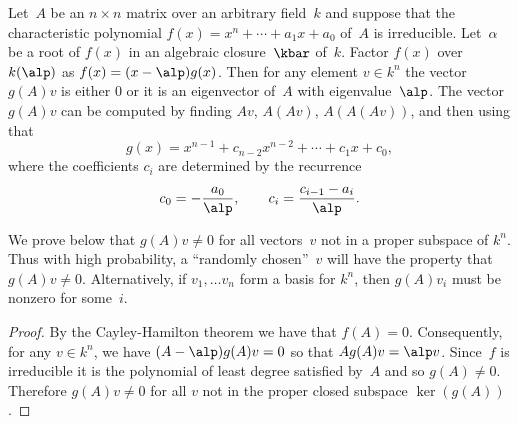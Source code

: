 \documentclass{report}
\begin{document}
\begin{algorithm}\label{alg:eigenvector}
Let~$A$ be an $n\times n$ matrix over an arbitrary field~$k$ and
suppose that the characteristic polynomial $f(x)=x^n+\cdots+a_1 x + a_0$
of~$A$ is irreducible.   Let~$\alpha$ be a root of $f(x)$
in an algebraic closure~$\kbar$ of~$k$.
Factor $f(x)$ over $k(\alp)$ as
 $f(x) = (x-\alp) g(x)$.
Then for any element $v\in k^n$ the vector
$g(A)v$ is either $0$ or it is an eigenvector of~$A$ with eigenvalue~$\alp$.
The vector $g(A)v$ can be computed by finding
$Av$, $A(Av)$, $A(A(Av))$, and then using that
  $$g(x)=x^{n-1}+c_{n-2} x^{n-2}+\cdots+c_1 x+ c_0,$$
where the coefficients $c_i$ are determined by the recurrence
$$c_0 = - \frac{a_0}{\alp},\qquad  c_i = \frac{c_{i-1}-a_i}{\alp}.$$

We prove below that $g(A)v\neq 0$ for all vectors~$v$ not
in a proper subspace of $k^n$.  Thus with high probability, a
``randomly chosen''~$v$ will have the property that $g(A)v\neq 0$.
Alternatively, if $v_1,\ldots v_n$ form a basis for $k^n$, then
$g(A)v_i$ must be nonzero for some~$i$.
\end{algorithm}
\begin{proof}
By the Cayley-Hamilton theorem \cite[XIV.3]{lang:algebra} we have
that $f(A)=0$.  Consequently, for any $v\in k^n$, we have
$(A-\alp)g(A)v=0$ so that $A g(A)v = \alp v$. Since~$f$ is
irreducible it is the polynomial of least degree satisfied by~$A$
and so $g(A)\neq 0$. Therefore $g(A)v\neq 0$ for all $v$ not in
the proper closed subspace $\ker(g(A))$.
\end{proof}
\end{document}

